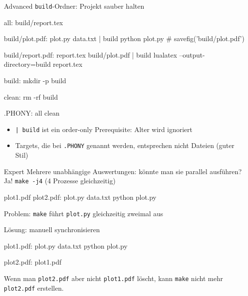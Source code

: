 \begin{frame}[fragile]{Advanced}
  \texttt{build}-Ordner: Projekt sauber halten

  \vspace{0.9em}
  \begin{lstmake}
    all: build/report.tex

    build/plot.pdf: plot.py data.txt | build
        python plot.py  # savefig('build/plot.pdf')

    build/report.pdf: report.tex build/plot.pdf | build
        lualatex --output-directory=build report.tex

    build:
        mkdir -p build

    clean:
        rm -rf build

    .PHONY: all clean
  \end{lstmake}
  \vspace{0.9em}

  \begin{itemize}
    \item \texttt{| build} ist ein order-only Prerequisite: Alter wird ignoriert
    \item Targets, die bei \texttt{.PHONY} genannt werden, entsprechen nicht Dateien (guter Stil)
  \end{itemize}
\end{frame}

\begin{frame}[fragile]{Expert}
  Mehrere unabhängige Auswertungen: könnte man sie parallel ausführen? \\
  Ja! \texttt{make -j4} (4 Prozesse gleichzeitig)

  \vspace{1em}
  \begin{lstmake}
    plot1.pdf plot2.pdf: plot.py data.txt
        python plot.py
  \end{lstmake}
  \vspace{1em}

  Problem: \texttt{make} führt \texttt{plot.py} gleichzeitig zweimal aus

  Lösung: manuell synchronisieren

  \vspace{1em}
  \begin{lstmake}
    plot1.pdf: plot.py data.txt
        python plot.py

    plot2.pdf: plot1.pdf
  \end{lstmake}
  \vspace{1em}

  Wenn man \texttt{plot2.pdf} aber nicht \texttt{plot1.pdf} löscht, kann \texttt{make} nicht mehr \texttt{plot2.pdf} erstellen.
\end{frame}
